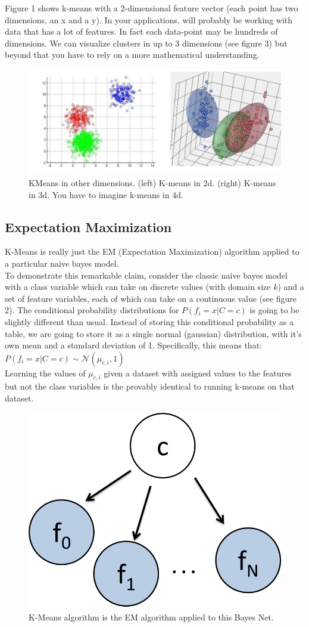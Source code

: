 \documentclass[10pt,letterpaper]{article}
\begin{document}
Figure 1 shows k-means with a 2-dimensional feature vector (each point has two dimensions, an x and a y). In your applications, will probably be working with data that has a lot of features. In fact each data-point may be hundreds of dimensions. We can visualize clusters in up to 3 dimensions (see figure 3) but beyond that you have to rely on a more mathematical understanding.\\

\begin{figure}[H]
\includegraphics[width=.6\textwidth]{kmeans3d.png}
\centering
\caption{KMeans in other dimensions. (left) K-means in 2d. (right) K-means in 3d. You have to imagine k-means in 4d.}
\label{figure3}
\end{figure}

\subsection{Expectation Maximization}
K-Means is really just the EM (Expectation Maximization) algorithm applied to a particular naive bayes model.\\

To demonstrate this remarkable claim, consider the classic naive bayes model with a class variable which can take on discrete values (with domain size $k$) and a set of feature variables, each of which can take on a continuous value (see figure 2). The conditional probability distributions for $P(f_i = x | C= c)$ is going to be slightly different than usual. Instead of storing this conditional probability as a table, we are going to store it as a single normal (gaussian) distribution, with it's own mean and a standard deviation of 1. Specifically, this means that: $P(f_i = x | C= c) \sim \mathcal{N}(\mu_{c,i}, 1)$\\

Learning the values of $\mu_{c,i}$ given a dataset with assigned values to the features but not the class variables is the provably identical to running k-means on that dataset.\\

\begin{figure}[H]
\includegraphics[width=.3\textwidth]{kmeansNB.png}
\centering
\caption{K-Means algorithm is the EM algorithm applied to this Bayes Net.}
\label{figure2}
\end{figure}
\end{document}
